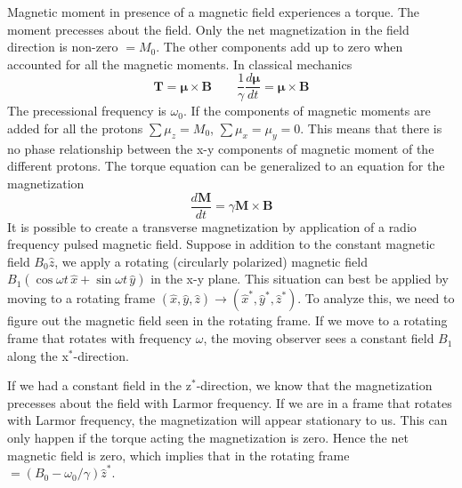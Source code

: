 \documentclass[aps,prb,onecolumn,notitlepage,showpacs,floatfix,superscriptaddress]{revtex4-1}
\begin{document}
Magnetic moment in presence of a magnetic field experiences a torque. The moment precesses about the field. Only the net magnetization in the field direction is non-zero $=M_0$. The other components add up to zero when accounted for all the magnetic moments. In classical mechanics
\begin{equation}
{\bm T} = {\bm \mu} \times {\bm B} \qquad \dfrac{1}{\gamma} \dfrac{d {\bm \mu}}{dt} = {\bm \mu} \times {\bm B} 
\end{equation}
The precessional frequency is $\omega_0$. If the components of magnetic moments are added for all the protons $\sum \mu_z = M_0$, $\sum \mu_x = \mu_y= 0$. This means that there is no phase relationship between the x-y components of magnetic moment of the different protons. The torque equation can be generalized to an equation for the magnetization
\begin{equation}
 \dfrac{d {\bm M}}{dt} =\gamma {\bm M} \times {\bm B} 
\end{equation}
It is possible to create a transverse magnetization by application of a radio frequency pulsed magnetic field. Suppose in addition to the constant magnetic field $B_0 \hat{z}$, we apply a rotating (circularly polarized) magnetic field $B_1 \left( \cos \omega t \,\hat{x} + \sin \omega t \, \hat{y}\right)$ in the x-y plane. This situation can best be applied by moving to a rotating frame $(\hat{x},\hat{y},\hat{z}) \rightarrow (\hat{x}^*,\hat{y}^*,\hat{z}^*)$. To analyze this, we need to figure out the magnetic field seen in the rotating frame. If we move to a rotating frame that rotates with frequency $\omega$, the moving observer sees a constant field $B_1$ along the x$^*$-direction. 

If we had a constant field in the z$^*$-direction, we know that the magnetization precesses about the field with Larmor frequency. If we are in a frame that rotates with Larmor frequency, the magnetization will appear stationary to us. This can only happen if the torque acting the magnetization is zero. Hence the net magnetic field is zero, which implies that in the rotating frame $ = (B_0 - \omega_0 /\gamma)\hat{z}^*$. 
\end{document}
